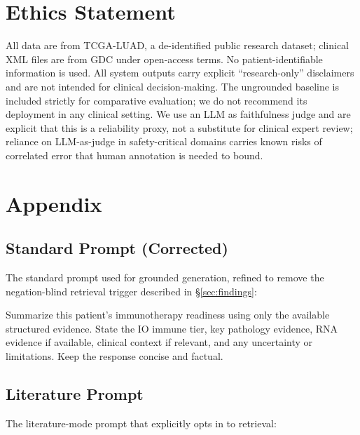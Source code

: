 \documentclass[11pt]{article}
\begin{document}
\section*{Ethics Statement}

All data are from TCGA-LUAD, a de-identified public research dataset; clinical XML files are from GDC under open-access terms. No patient-identifiable information is used. All system outputs carry explicit ``research-only'' disclaimers and are not intended for clinical decision-making. The ungrounded baseline is included strictly for comparative evaluation; we do not recommend its deployment in any clinical setting. We use an LLM as faithfulness judge and are explicit that this is a reliability proxy, not a substitute for clinical expert review; reliance on LLM-as-judge in safety-critical domains carries known risks of correlated error that human annotation is needed to bound.



\pagebreak
\appendix
\section{Appendix}

\subsection{Standard Prompt (Corrected)}

The standard prompt used for grounded generation, refined to remove the negation-blind retrieval trigger described in \S\ref{sec:findings}:

\begin{tcolorbox}[
    colback=gray!10,
    colframe=gray!50,
    sharp corners,
    boxrule=0.5pt,
    left=5pt,
    right=5pt,
    top=5pt,
    bottom=5pt,
    width=\linewidth,
    boxsep=2pt
]
Summarize this patient's immunotherapy readiness using only the available structured evidence. State the IO immune tier, key pathology evidence, RNA evidence if available, clinical context if relevant, and any uncertainty or limitations. Keep the response concise and factual.
\end{tcolorbox}

\subsection{Literature Prompt}

The literature-mode prompt that explicitly opts in to retrieval:
\end{document}
